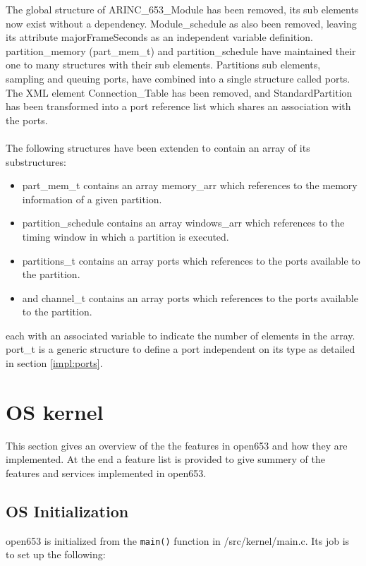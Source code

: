 The global structure of ARINC\_653\_Module has been removed, its sub elements now exist without a dependency. 
Module\_schedule as also been removed, leaving its attribute majorFrameSeconds as an independent variable definition. 
partition\_memory (part\_mem\_t) and partition\_schedule have maintained their one to many structures with their sub elements. 
Partitions sub elements, sampling and queuing ports, have combined into a single structure called ports. 
The XML element Connection\_Table has been removed, and StandardPartition has
been transformed into a port reference list which shares an association with the ports.
\\\\
The following structures have been extenden to contain an array of its substructures:
\begin{itemize}
	\item part\_mem\_t contains an array memory\_arr which references to the memory information of a given partition.
	\item partition\_schedule contains an array windows\_arr which references to the timing window in which a partition is executed.
	\item partitions\_t contains an array ports which references to the ports available to the partition.
	\item and channel\_t contains an array ports which references to the ports available to the partition.
\end{itemize}

each with an associated variable to indicate the number of elements in the array.\\

port\_t is a generic structure to define a port independent on its type as
detailed in section \ref{impl:ports}.

\section{OS kernel}
This section gives an overview of the the features in open653 and how they are
implemented. At the end a feature list is provided to give summery of the features
and services implemented in open653.

\subsection{OS Initialization}
open653 is initialized from the \texttt{main()} function in /src/kernel/main.c.
Its job is to set up the following:

